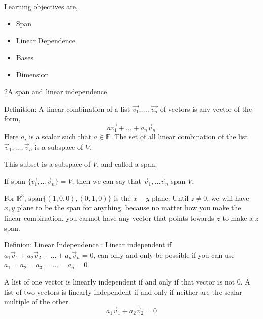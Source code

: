 \documentclass[a4paper]{article}
\begin{document}
Learning objectives are,
\begin{itemize}
	\item Span
	\item Linear Dependence
	\item Bases
	\item Dimension
\end{itemize}

2A span and linear independence. 

Definition: A linear combination of a list $\vec{v_1}, \ldots , \vec{v_n}$ of vectors is any vector of the form,
\[
a \vec{v_1} + \ldots + a_n \vec{v}_n
\] 
Here $a_i$ is a scalar such that $a \in \mathbb{F}$. The set of all linear combination of the list $\vec{v}_1, \ldots, \vec{v}_n$ is a subspace of $V$.

This subset is a subspace of $V$, and called a span. 

If span $\{\vec{v_1}, \ldots \vec{v}_n\}= V$, then we can say that $\vec{v}_1, \ldots \vec{v}_n$ span $V$. 

For $\mathbb{R}^{3}$, $\text{span}\{(1,0,0),(0,1,0) \}$ is the  $x-y$ plane. Until $z\neq 0$, we will have $x,y$ plane to be the span for anything, because no matter how you make the linear combination, you cannot have any vector that points towards $z$ to make a $z$ span.

Definion: Linear Independence : 
Linear independent if $a_1 \vec{v}_1 + a_2 \vec{v}_2 + \ldots + a_n \vec{v}_n = 0$, can only and only be possible if you can use $a_1 = a_2 = a_3 = \ldots = a_n = 0$.

A list of one vector is linearly independent if and only if that vector is not $0$. A list of two vectors is linearly independent if and only if neither are the scalar multiple of the other. 
\[
a_1 \vec{v}_1 + a_2 \vec{v}_2 = 0
\] 
\end{document}
